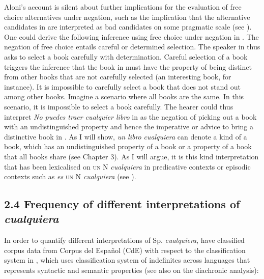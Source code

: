 \documentclass[output=paper]{langscibook}
\begin{document}
  Aloni’s account is silent about further implications for the evaluation of free choice alternatives under negation, such as the implication that the alternative candidates in  are interpreted as bad candidates on some pragmatic scale (see \citealt{Horn2000}). One could derive the following inference using free choice under negation in . The negation of free choice entails careful or determined selection. The speaker in  thus asks to select a book carefully with determination. Careful selection of a book triggers the inference that the book in  must have the property of being distinct from other books that are not carefully selected (an interesting book, for instance). It is impossible to carefully select a book that does not stand out among other books. Imagine a scenario where all books are the same. In this scenario, it is impossible to select a book carefully. The hearer could thus interpret \textit{No puedes traer cualquier libro} in  as the negation of picking out a book with an undistinguished property and hence the imperative or advice to bring a distinctive book in . As I will show, \textit{un libro} \textit{cualquiera} can denote a kind of a book, which has an undistinguished property of a book or a property of a book that all books share (see Chapter 3). As I will argue, it is this kind interpretation that has been lexicalised on \textsc{un} N \textit{cualquiera} in predicative contexts or episodic contexts such as \textit{es} \textsc{un} N \textit{cualquiera} (see ). 

\subsection{\textbf{2.4} \textbf{Frequency} \textbf{of} \textbf{different} \textbf{interpretations} \textbf{of} \textbf{\textit{cualquiera}}}

In order to quantify different interpretations of Sp. \textit{cualquiera}, \citet{AloniEtAl2010} have classified corpus data from Corpus del Español (CdE) with respect to the classification system in , which uses  classification system of indefinites across languages that represents syntactic and semantic properties (see also  on the diachronic analysis):
\end{document}
